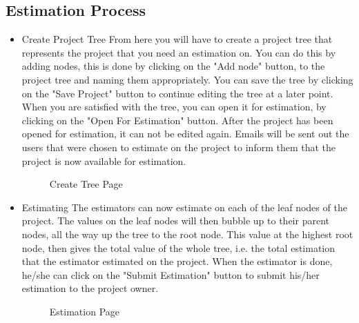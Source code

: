 \subsection{Estimation Process}
\begin{itemize}
	\item{Create Project Tree}
	\newline
	From here you will have to create a project tree that represents the project that you need an estimation on. You can do this by adding nodes, this is done by clicking on the "Add node" button, to the project tree and naming them appropriately. You can save the tree by clicking on the "Save Project" button to continue editing the tree at a later point. When you are satisfied with the tree, you can open it for estimation, by clicking on the "Open For Estimation" button. After the project has been opened for estimation, it can not be edited again. Emails will be sent out the users that were chosen to estimate on the project to inform them that the project is now available for estimation.
	\begin{figure}[H]
	    	\centering
	    	\caption{Create Tree Page}
	    	\label{fig:Learning rate 0.1}
   	\end{figure}
	\item{Estimating}
	\newline
	The estimators can now estimate on each of the leaf nodes of the project. The values on the leaf nodes will then bubble up to their parent nodes, all the way up the tree to the root node. This value at the highest root node, then gives the total value of the whole tree, i.e. the total estimation that the estimator estimated on the project. When the estimator is done, he/she can click on the "Submit Estimation" button to submit his/her estimation to the project owner.
	\begin{figure}[H]
	    	\centering
	    	\caption{Estimation Page}
	    	\label{fig:Learning rate 0.1}
   	\end{figure}
\end{itemize}
